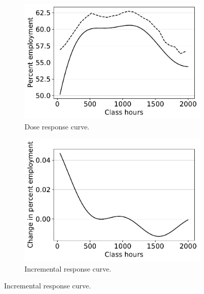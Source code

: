 \begin{figure}[ht]
\begin{centering}
     \begin{subfigure}[b]{0.45\textwidth}
         \centering
         \includegraphics[width=\textwidth]{img/ATE_JCdata_dm_filter_with_dml_bma.pdf}
         \caption{Dose response curve.}
     \end{subfigure}
     \hfill
     \begin{subfigure}[b]{0.45\textwidth}
         \centering
         \includegraphics[width=\textwidth]{img/Incremental_ATE_JCdata_dm_filter_bma.pdf}
         \caption{Incremental response curve.}
     \end{subfigure}

\end{centering}
\end{figure}
